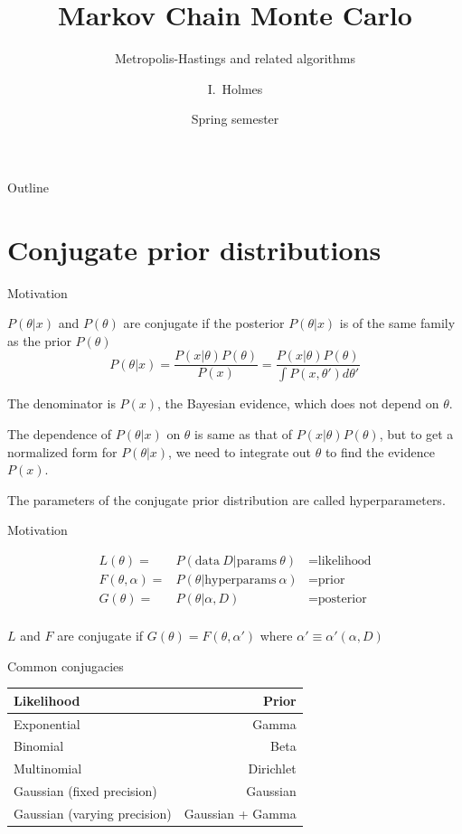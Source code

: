 \documentclass{beamer}
\title[MCMC] %
{Markov Chain Monte Carlo}
\subtitle
{Metropolis-Hastings and related algorithms} %
\author%
{I.~Holmes} %
\institute[University of California, Berkeley] %
{
  Department of Bioengineering\\
  University of California, Berkeley}
\date%
{Spring semester}
\begin{document}
\begin{frame}
  \titlepage
\end{frame}

\begin{frame}{Outline}
  \tableofcontents
\end{frame}

\section{Conjugate prior distributions}

\begin{frame}{Motivation}

\itemb
\item $P(\theta|x)$ and $P(\theta)$ are \alert{conjugate} if the posterior $P(\theta|x)$ is of the same family as the prior $P(\theta)$
\[
P(\theta|x) = \frac{P(x|\theta) P(\theta)}{P(x)} = \frac{P(x|\theta) P(\theta)}{\int P(x,\theta') d\theta'}
\]
\item The denominator is $P(x)$, the \alert{Bayesian evidence}, which does not depend on $\theta$.
\item The dependence of $P(\theta|x)$ on $\theta$ is same as that of $P(x|\theta)P(\theta)$,
but to get a normalized form for $P(\theta|x)$, we need to integrate out $\theta$ to find the evidence $P(x)$.
\item The parameters of the conjugate prior distribution are called \alert{hyperparameters}.
\iteme

\end{frame}

\begin{frame}{Motivation}

\begin{eqnarray*}
L(\theta) = & P(\mbox{data}\ D|\mbox{params}\ \theta) & = \mbox{likelihood} \\
F(\theta,\alpha) = & P(\theta|\mbox{hyperparams}\ \alpha) & = \mbox{prior} \\
G(\theta) = & P(\theta|\alpha, D) & = \mbox{posterior} \\
\end{eqnarray*}

$L$ and $F$ are conjugate if $G(\theta) = F(\theta,\alpha')$ where $\alpha' \equiv \alpha'(\alpha,D)$

\end{frame}

\begin{frame}{Common conjugacies}

\begin{tabular}{lr}
Likelihood & Prior \\
\hline
Exponential & Gamma \\
Binomial & Beta \\
Multinomial & Dirichlet \\
Gaussian (fixed precision) & Gaussian \\
Gaussian (varying precision) & Gaussian + Gamma \\
\end{tabular}

\end{frame}
\end{document}
